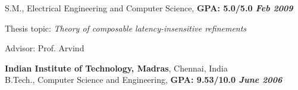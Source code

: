 \documentclass[margin]{resume}
\begin{document}
\begin{resume}
\begin{list2}
    \end{list2}%
    S.M., Electrical Engineering and Computer Science, \hfill \textbf{GPA: 5.0/5.0 \textit{Feb 2009}}\\
    \begin{list2}
        \item Thesis topic: \textit{Theory of composable latency-insensitive refinements}
        \item Advisor:  Prof. Arvind
    \end{list2}%
    \textbf{Indian Institute of Technology, Madras}, Chennai, India\\
    B.Tech., Computer Science and Engineering, \hfill \textbf{GPA: 9.53/10.0 \textit{June 2006}}\\



\end{resume}
\end{document}
